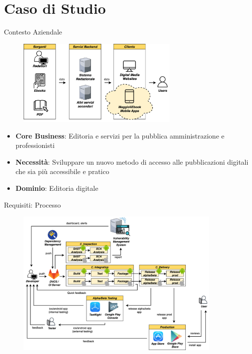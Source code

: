 
\section{Caso di Studio}

\begin{frame}{Contesto Aziendale}
    \begin{figure}[H]
        \includegraphics[width=0.7\textwidth]{img/contesto-aziendale.png}
    \end{figure}
    \begin{itemize}
        \item \textbf{Core Business}: Editoria e servizi per la pubblica amministrazione e professionisti
        \item \textbf{Necessità}: Sviluppare un nuovo metodo di accesso alle pubblicazioni digitali che sia più accessibile e pratico
        \item \textbf{Dominio}: Editoria digitale
    \end{itemize}
\end{frame}

\begin{frame}{Requisiti: Processo}
    \begin{figure}[H]
        \includegraphics[width=0.89\textwidth]{img/full-cicd.png}
    \end{figure}
\end{frame}

